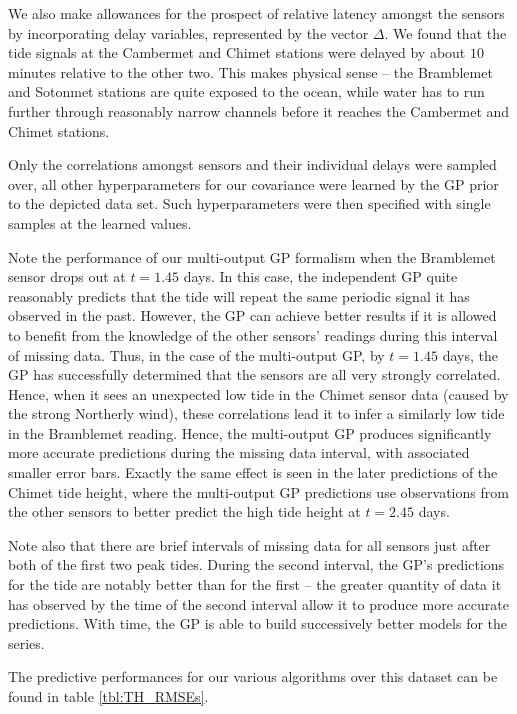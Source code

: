 \documentclass{acmtrans2m}
\begin{document}
We also make allowances for the prospect of relative latency amongst the sensors by incorporating delay variables, represented by the vector $\Delta$. We found that the tide signals at the Cambermet and Chimet stations were delayed by about $10$ minutes relative to the other two. This makes physical sense -- the Bramblemet and Sotonmet stations are quite exposed to the ocean, while water has to run further through reasonably narrow channels before it reaches the Cambermet and Chimet stations.

Only the correlations amongst sensors and their individual delays were sampled over, all other hyperparameters for our covariance were learned by the GP prior to the depicted data set. Such hyperparameters were then specified with single samples at the learned values.

Note the performance of our multi-output GP formalism when the Bramblemet sensor drops out at $t=1.45$ days.
In this case, the independent GP quite reasonably predicts that the tide will repeat the same periodic signal it has observed in the past. However, the GP can achieve better results if it is allowed to benefit from the knowledge of the other sensors' readings during this interval of missing data. Thus, in the case of the multi-output GP, by $t=1.45$ days, the GP has successfully determined that the sensors are all very strongly correlated. Hence, when it sees an unexpected low tide in the Chimet sensor data (caused by the strong Northerly wind), these correlations lead it to infer a similarly low tide in the Bramblemet reading. Hence, the multi-output GP produces significantly more accurate predictions during the missing data interval, with associated smaller error bars. Exactly the same effect is seen in the later predictions of the Chimet tide height, where the multi-output GP predictions use observations from the other sensors to better predict the high tide height at $t=2.45$ days. 

Note also that there are brief intervals of missing data for all sensors just after both of the first two peak tides. During the second interval, the GP's predictions for the tide are notably better than for the first -- the greater quantity of data it has observed by the time of the second interval allow it to produce more accurate predictions. With time, the GP is able to build successively better models for the series.

The predictive performances for our various algorithms over this dataset can be found in table \ref{tbl:TH_RMSEs}.
\end{document}
